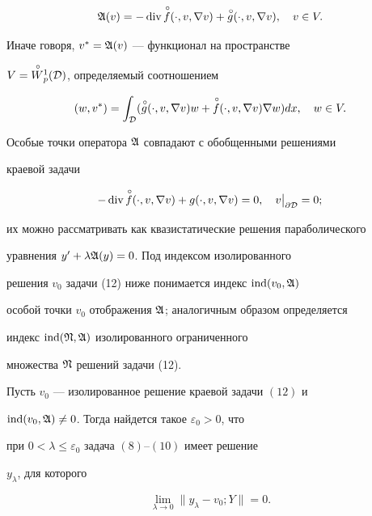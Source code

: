 \begin{equation} 


\frak A(v)=-\Div\up{f}(\cdot,v,\nabla v)+ 


\up{g}(\cdot,v,\nabla v),\quad v\in V. 


\end{equation} 


Иначе говоря, $v^*=\frak A(v)$ --- функционал на пространстве 


$V=\overset{\,\circ}{W}{}^1_p(\cal D)$, определяемый соотношением 


$$ 


(w,v^*)=\int_{\cal D}(\up{g}(\cdot,v,\nabla v)w+ 


\up{f}(\cdot,v,\nabla v)\nabla w)d x,\quad w\in V. 


$$ 


Особые точки оператора $\frak A$ совпадают с обобщенными решениями 


краевой задачи 


\begin{equation} 


-\Div\up{f}(\cdot,v,\nabla v)+g(\cdot,v,\nabla v)=0,\quad 


v\big|_{\partial\cal D}=0; 


\end{equation} 


их можно рассматривать как квазистатические решения параболического 


уравнения $y'+\linebreak \lambda\frak A(y)=0$. Под индексом изолированного 


решения $v_0$ задачи (12) ниже понимается индекс $\operatorname{ind}(v_0,\frak A)$ 


особой точки $v_0$ отображения $\frak A$; аналогичным образом определяется 


индекс $\operatorname{ind}(\frak N,\frak A)$ изолированного ограниченного 


множества $\frak N$ решений задачи (12). 


 


\begin{thm} 


Пусть $v_0$ --- изолированное решение краевой задачи $(12)$ и 


$\operatorname{ind}(v_0,\frak A)\ne0$. Тогда найдется такое $\varepsilon_0>0$, что 


при $0<\lambda\le\varepsilon_0$ задача $(8)$--$(10)$ имеет решение 


$y_\lambda$, для которого 


$$ 


\lim_{\lambda\to0}\|y_\lambda-v_0;Y\|=0. 


$$ 


\end{thm} 


